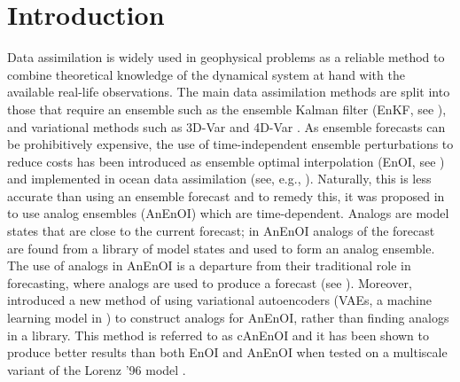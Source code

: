 \documentclass[final,3p]{elsarticle}
\theoremstyle{break}
\begin{document}
	\section{Introduction}
\label{sec:intro}
Data assimilation is widely used in geophysical problems as a reliable method to combine theoretical knowledge of the dynamical system at hand with the available real-life observations.
The main data assimilation methods are split into those that require an ensemble such as the ensemble Kalman filter (EnKF, see \cite{Evensen2003}), and variational methods such as 3D-Var and 4D-Var \cite{assimilation2010making}.
As ensemble forecasts can be prohibitively expensive, the use of time-independent ensemble perturbations to reduce costs has been introduced as ensemble optimal interpolation (EnOI, see \cite{Oke2002,Evensen2003}) and implemented in ocean data assimilation (see, e.g., \cite{Oke2010}).
Naturally, this is less accurate than using an ensemble forecast and to remedy this, it was proposed in \cite{grooms2020analog} to use analog ensembles (AnEnOI) which are time-dependent.
Analogs are model states that are close to the current forecast; in AnEnOI analogs of the forecast are found from a library of model states and used to form an analog ensemble.
The use of analogs in AnEnOI is a departure from their traditional role in forecasting, where analogs are used to produce a forecast (see \cite{delle2013probabilistic,eckel2016hybrid,zhao2016analog}).
Moreover, \cite{grooms2020analog} introduced a new method of using variational autoencoders (VAEs, a machine learning model in \cite{Kingma2014}) to construct analogs for AnEnOI, rather than finding analogs in a library.
This method is referred to as cAnEnOI and it has been shown to produce better results than both EnOI and AnEnOI when tested on a multiscale variant \cite{grooms2015framework} of the Lorenz '96 model \cite{lorenz1996predictability}. \par
\end{document}
